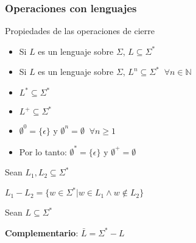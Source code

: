 \begin{frame}
  \frametitle{Operaciones con lenguajes}
      \begin{block}{Propiedades de las operaciones de cierre}
           \begin{itemize}[<+->]
           \item Si $L$ es un lenguaje sobre $\Sigma$, $L \subseteq \Sigma^*$
           \item Si $L$ es un lenguaje sobre $\Sigma$, $L^n \subseteq \Sigma^* \; \; \forall n \in \mathbb{N}$
           \item $L^* \subseteq \Sigma^*$
           \item $L^+ \subseteq \Sigma^*$
           \item $\emptyset^0 = \{ \epsilon \}$ y $\emptyset^n = \emptyset \; \; \forall n \geq 1$
           \item Por lo tanto: $\emptyset ^* =  \{ \epsilon \}$ y $\emptyset ^+ = \emptyset$
           \end{itemize}
			\end{block}

      \pause
			Sean $L_1, L_2 \subseteq \Sigma^*$
      \begin{defi}
			$L_1 - L_2 = \{w \in \Sigma^* | w \in L_1 \wedge w \not \in L_2\}$
      \end{defi}
      \pause

      \pause
			Sean $L \subseteq \Sigma^*$
      \begin{defi}
			\textbf{Complementario}: $\bar L = \Sigma^* - L$
      \end{defi}
\end{frame}
